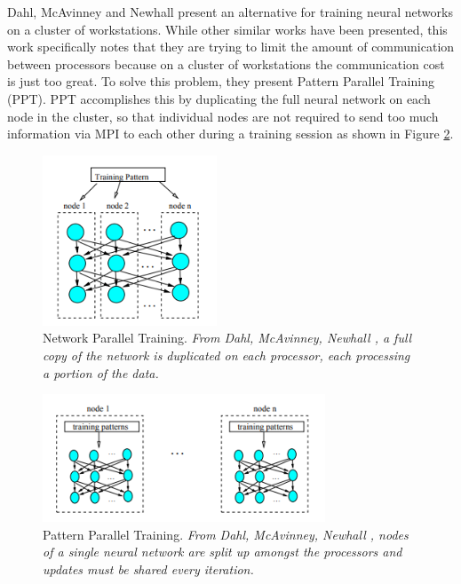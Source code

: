 \documentclass[11pt,twocolumn]{article}
\begin{document}
Dahl, McAvinney and Newhall \cite{dahl:NNCluster} present an alternative for training neural networks on a cluster of workstations. While other similar works have been presented, this work specifically notes that they are trying to limit the amount of communication between processors because on a cluster of workstations the communication cost is just too great. To solve this problem, they present Pattern Parallel Training (PPT). PPT accomplishes this by duplicating the full neural network on each node in the cluster, so that individual nodes are not required to send too much information via MPI to each other during a training session as shown in Figure \ref{PPT}. 
\begin{figure}[t]
    \centerline{
        \includegraphics[height=2in]{NPT.png}
    }
    \caption{
        \label{NPT}  Network Parallel Training.
        {\em From Dahl, McAvinney, Newhall \cite{dahl:NNCluster}, a full copy of the network is duplicated on each processor, each processing a portion of the data.}
    }
\end{figure}
\begin{figure}[t]
    \centerline{
        \includegraphics[height=1.5in]{PPT.png}
    }
    \caption{
        \label{PPT}  Pattern Parallel Training. {\em From Dahl, McAvinney, Newhall \cite{dahl:NNCluster}, nodes of a single neural network are split up amongst the processors and updates must be shared every iteration.}
    }
\end{figure}
\end{document}
